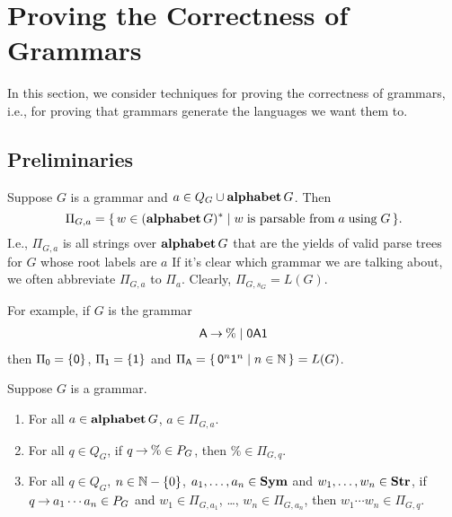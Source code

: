 \section{Proving the Correctness of Grammars}
\label{ProvingTheCorrectnessOfGrammars}

In this section, we consider techniques for proving the correctness of
grammars, i.e., for proving that grammars generate the languages we want
them to.

\subsection{Preliminaries}

Suppose $G$ is a grammar and $a\in Q_G\cup\mathbf{alphabet}\,G$.  Then
\begin{displaymath}
\Pi_{G,a}=\{ \, w\in(\mathbf{alphabet}\,G)^* \mid w \;\allowbreak\mbox{is parsable from}\allowbreak\; a
  \;\allowbreak\mbox{using}\allowbreak\; G \, \} .  
\end{displaymath}
I.e., $\Pi_{G,a}$ is all strings over $\mathbf{alphabet}\,G$ that are the
yields of valid parse trees for $G$ whose root labels are $a$ If it's
clear which grammar we are talking about, we often abbreviate
$\Pi_{G,a}$ to $\Pi_a$.  Clearly, $\Pi_{G,s_G} = L(G)$.

For example, if $G$ is the grammar
\begin{gather*}
  \mathsf{A} \mathbin{\to} \% \mid \mathsf{0}\mathsf{A}\mathsf{1}
\end{gather*}
then $\Pi_{\mathsf{0}}=\{\mathsf{0}\}$, $\Pi_{\mathsf{1}}=\{\mathsf{1}\}$ and $\Pi_{\mathsf{A}}=
\{ \, \mathsf{0}^n\mathsf{1}^n \mid n\in\mathbb{N} \, \}= L(G)$.

\begin{proposition}
\label{PiProp}
Suppose $G$ is a grammar.
\begin{enumerate}[\quad(1)]
\item For all $a\in\mathbf{alphabet}\,G$, ${a}\in\Pi_{G,a}$.

\item For all $q\in Q_G$, if $q\mathbin{\to}\%\in P_G$, then
  ${\%}\in\Pi_{G,q}$.

\item For all $q\in Q_G$, $n\in\mathbb{N}-\{0\}$, $a_1,\ldots,a_n\in\mathbf{Sym}$
  and $w_1,\ldots,w_n\in\mathbf{Str}$, if $q\mathbin{\to} a_1\cdots a_n\in P_G$ and
  $w_1\in\Pi_{G,a_1}$, \ldots, $w_n\in\Pi_{G,a_n}$, then
  ${w_1\cdots w_n}\in\Pi_{G,q}$.
\end{enumerate}
\end{proposition}

